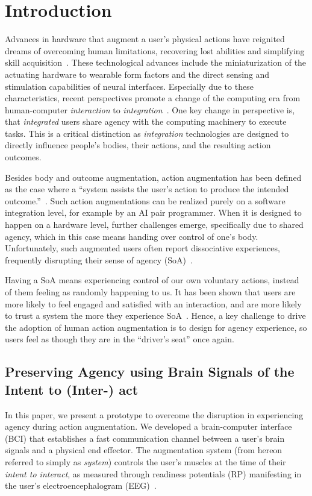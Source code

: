 \section{Introduction}

Advances in hardware that augment a user's physical actions have reignited dreams of overcoming human limitations, recovering lost abilities and simplifying skill acquisition~\citep{Goto2020-mw, Kunze2017-co}. These technological advances include the miniaturization of the actuating hardware to wearable form factors and the direct sensing and stimulation capabilities of neural interfaces. Especially due to these characteristics, recent perspectives promote a change of the computing era from human-computer \textit{interaction} to \textit{integration}~\cite{Mueller2020-dl}. One key change in perspective is, that \textit{integrated} users share agency with the computing machinery to execute tasks. This is a critical distinction as \textit{integration} technologies are designed to directly influence people’s bodies, their actions, and the resulting action outcomes.

Besides body and outcome augmentation, action augmentation has been defined as the case where a ``system assists the user’s action to produce the intended outcome.''~\cite{Cornelio2022-aq}. Such action augmentations can be realized purely on a software integration level, for example by an AI pair programmer. When it is designed to happen on a hardware level, further challenges emerge, specifically due to shared agency, which in this case means handing over control of one's body. Unfortunately, such augmented users often report dissociative experiences, frequently disrupting their sense of agency (SoA)~\citep{Gilbert2017-ze, Gilbert2019-uc}.


Having a SoA means experiencing control of our own voluntary actions, instead of them feeling as randomly happening to us. It has been shown that users are more likely to feel engaged and satisfied with an interaction, and are more likely to trust a system the more they experience SoA~\citep{Berberian2012-do, Miller2007-rb}. Hence, a key challenge to drive the adoption of human action augmentation is to design for agency experience, so users feel as though they are in the ``driver's seat'' once again.

\subsection{Preserving Agency using Brain Signals of the Intent to (Inter-) act}
In this paper, we present a prototype to overcome the disruption in experiencing agency during action augmentation. We developed a brain-computer interface (BCI) that establishes a fast communication channel between a user's brain signals and a physical end effector. The augmentation system (from hereon referred to simply as \textit{system}) controls the user's muscles at the time of their \textit{intent to interact}, as measured through readiness potentials (RP) manifesting in the user's electroencephalogram (EEG)~\cite{Schurger2021-vp, Schultze-Kraft2016-bx, Schultze-Kraft2021-cu}. 

